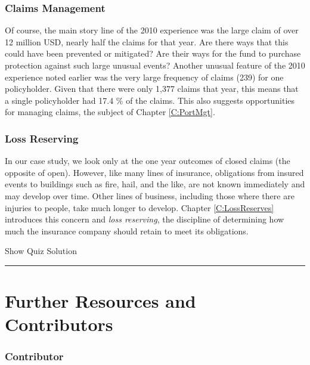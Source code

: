 \documentclass[]{book}
\theoremstyle{definition}
\theoremstyle{definition}
\theoremstyle{definition}
\theoremstyle{remark}
\begin{document}
\subsubsection*{Claims Management}\label{claims-management}

Of course, the main story line of the 2010 experience was the large
claim of over 12 million USD, nearly half the claims for that year. Are
there ways that this could have been prevented or mitigated? Are their
ways for the fund to purchase protection against such large unusual
events? Another unusual feature of the 2010 experience noted earlier was
the very large frequency of claims (239) for one policyholder. Given
that there were only 1,377 claims that year, this means that a single
policyholder had 17.4 \% of the claims. This also suggests opportunities
for managing claims, the subject of Chapter \ref{C:PortMgt}.

\subsubsection*{Loss Reserving}\label{loss-reserving}

In our case study, we look only at the one year outcomes of closed
claims (the opposite of open). However, like many lines of insurance,
obligations from insured events to buildings such as fire, hail, and the
like, are not known immediately and may develop over time. Other lines
of business, including those where there are injuries to people, take
much longer to develop. Chapter \ref{C:LossReserves} introduces this
concern and \emph{loss reserving}, the discipline of determining how
much the insurance company should retain to meet its obligations.

\hypertarget{surveyElement13}{}

\hypertarget{surveyResult13}{}

Show Quiz Solution

\hypertarget{display.Quiz13.2}{}
\begin{center}\rule{0.5\linewidth}{\linethickness}\end{center}

\section{Further Resources and
Contributors}\label{Intro-further-reading-and-resources}

\subsubsection*{Contributor}\label{contributor}
\end{document}
